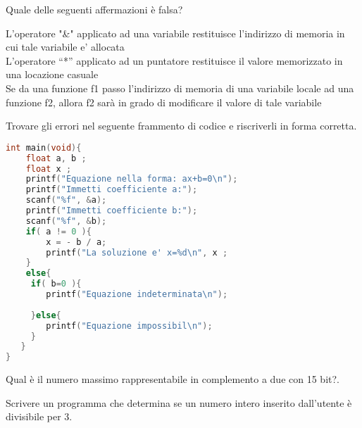 \documentclass[addpoints,11pt]{exam}
\begin{document}
\begin{questions}

\question[2]
Quale delle seguenti affermazioni è falsa?

\begin{oneparcheckboxes}
  \choice L’operatore "\&" applicato ad una variabile restituisce l’indirizzo di memoria in cui tale variabile e' allocata\\
  \choice L’operatore “*” applicato ad un puntatore restituisce il valore memorizzato in una locazione casuale\\
  \choice Se da una funzione f1 passo l’indirizzo di memoria di una variabile locale ad una funzione f2, allora f2 sarà
  in grado di modificare il valore di tale variabile\\
\end{oneparcheckboxes}


\question[2]
Trovare gli errori nel seguente frammento di codice e riscriverli in forma corretta.

\begin{minipage}[t]{0.5\linewidth}
\begin{lstlisting}[language=C]
int main(void){
    float a, b ;
    float x ;
    printf("Equazione nella forma: ax+b=0\n");
    printf("Immetti coefficiente a:");
    scanf("%f", &a);
    printf("Immetti coefficiente b:");
    scanf("%f", &b);
    if( a != 0 ){
        x = - b / a;
        printf("La soluzione e' x=%d\n", x ;
    }
    else{
     if( b=0 ){
        printf("Equazione indeterminata\n");
                
     }else{
        printf("Equazione impossibil\n");
     }
   }
}
\end{lstlisting}
\end{minipage}
\begin{minipage}[t]{0.5\linewidth}
  \makeemptybox{225pt}
\end{minipage}
\newpage

\question[2]
Qual è il numero massimo rappresentabile in complemento a due con 15 bit?.\\
\begin{minipage}[t]{1\linewidth}
	\makeemptybox{110pt}
\end{minipage}


\question[2]
Scrivere un programma che determina se un numero intero inserito dall’utente è divisibile per 3.\\
\begin{minipage}[t]{1\linewidth}
	\makeemptybox{320pt}
\end{minipage}

\end{questions}
\end{document}
